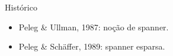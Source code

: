 \documentclass[dvipsnames]{beamer}
\newcommand{\R}{\mathbb{R}}
\begin{document}

\begin{frame}{Histórico}
  \begin{itemize}
    \item Peleg \& Ullman, 1987: noção de spanner.
    \item Peleg \& Sch\"{a}ffer, 1989: spanner esparsa.
  \end{itemize}
\end{frame}

\end{document}

